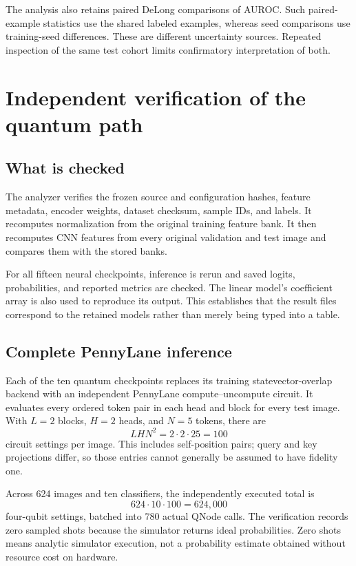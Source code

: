 \documentclass[11pt,a4paper]{report}
\newcommand{\code}[1]{\texttt{\detokenize{#1}}}
\begin{document}
The analysis also retains paired DeLong comparisons of AUROC. Such paired-example statistics use the shared labeled examples, whereas seed comparisons use training-seed differences. These are different uncertainty sources. Repeated inspection of the same test cohort limits confirmatory interpretation of both.

\chapter{Independent verification of the quantum path}
\section{What is checked}
The analyzer verifies the frozen source and configuration hashes, feature metadata, encoder weights, dataset checksum, sample IDs, and labels. It recomputes normalization from the original training feature bank. It then recomputes CNN features from every original validation and test image and compares them with the stored banks.

For all fifteen neural checkpoints, inference is rerun and saved logits, probabilities, and reported metrics are checked. The linear model's coefficient array is also used to reproduce its output. This establishes that the result files correspond to the retained models rather than merely being typed into a table.

\section{Complete PennyLane inference}
Each of the ten quantum checkpoints replaces its training statevector-overlap backend with an independent PennyLane \code{default.qubit} compute--uncompute circuit. It evaluates every ordered token pair in each head and block for every test image. With $L=2$ blocks, $H=2$ heads, and $N=5$ tokens, there are
\begin{equation}
LHN^2=2\cdot2\cdot25=100
\end{equation}
circuit settings per image. This includes self-position pairs; query and key projections differ, so those entries cannot generally be assumed to have fidelity one.

Across 624 images and ten classifiers, the independently executed total is
\begin{equation}
624\cdot10\cdot100=624,000
\end{equation}
four-qubit settings, batched into 780 actual QNode calls. The verification records zero sampled shots because the simulator returns ideal probabilities. Zero shots means analytic simulator execution, not a probability estimate obtained without resource cost on hardware.
\end{document}

